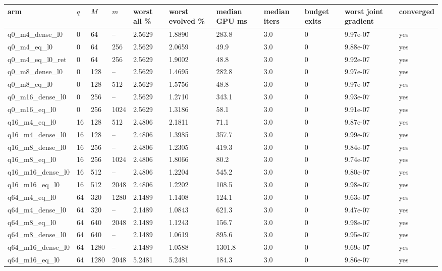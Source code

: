 \documentclass[11pt]{article}
\begin{document}
\begin{table}[htbp]\centering\small
\begin{tabular}{lllllllllll}\hline
arm & $q$ & $M$ & $m$ & worst all \% & worst evolved \% & median GPU ms & median iters & budget exits & worst joint gradient & converged \\ \hline
q0\_m4\_dense\_l0 & 0 & 64 & -- & 2.5629 & 1.8890 & 283.8 & 3.0 & 0 & 9.97e-07 & yes \\
q0\_m4\_eq\_l0 & 0 & 64 & 256 & 2.5629 & 2.0659 & 49.9 & 3.0 & 0 & 9.88e-07 & yes \\
q0\_m4\_eq\_l0\_ret & 0 & 64 & 256 & 2.5629 & 1.9002 & 48.8 & 3.0 & 0 & 9.92e-07 & yes \\
q0\_m8\_dense\_l0 & 0 & 128 & -- & 2.5629 & 1.4695 & 282.8 & 3.0 & 0 & 9.97e-07 & yes \\
q0\_m8\_eq\_l0 & 0 & 128 & 512 & 2.5629 & 1.5756 & 48.8 & 3.0 & 0 & 9.97e-07 & yes \\
q0\_m16\_dense\_l0 & 0 & 256 & -- & 2.5629 & 1.2710 & 343.1 & 3.0 & 0 & 9.93e-07 & yes \\
q0\_m16\_eq\_l0 & 0 & 256 & 1024 & 2.5629 & 1.3186 & 58.1 & 3.0 & 0 & 9.91e-07 & yes \\
q16\_m4\_eq\_l0 & 16 & 128 & 512 & 2.4806 & 2.1811 & 71.1 & 3.0 & 0 & 9.87e-07 & yes \\
q16\_m4\_dense\_l0 & 16 & 128 & -- & 2.4806 & 1.3985 & 357.7 & 3.0 & 0 & 9.99e-07 & yes \\
q16\_m8\_dense\_l0 & 16 & 256 & -- & 2.4806 & 1.2305 & 419.3 & 3.0 & 0 & 9.84e-07 & yes \\
q16\_m8\_eq\_l0 & 16 & 256 & 1024 & 2.4806 & 1.8066 & 80.2 & 3.0 & 0 & 9.74e-07 & yes \\
q16\_m16\_dense\_l0 & 16 & 512 & -- & 2.4806 & 1.2204 & 545.2 & 3.0 & 0 & 9.80e-07 & yes \\
q16\_m16\_eq\_l0 & 16 & 512 & 2048 & 2.4806 & 1.2202 & 108.5 & 3.0 & 0 & 9.98e-07 & yes \\
q64\_m4\_eq\_l0 & 64 & 320 & 1280 & 2.1489 & 1.1408 & 124.1 & 3.0 & 0 & 9.63e-07 & yes \\
q64\_m4\_dense\_l0 & 64 & 320 & -- & 2.1489 & 1.0843 & 621.3 & 3.0 & 0 & 9.47e-07 & yes \\
q64\_m8\_eq\_l0 & 64 & 640 & 2048 & 2.1489 & 1.1243 & 156.7 & 3.0 & 0 & 9.98e-07 & yes \\
q64\_m8\_dense\_l0 & 64 & 640 & -- & 2.1489 & 1.0619 & 895.6 & 3.0 & 0 & 9.95e-07 & yes \\
q64\_m16\_dense\_l0 & 64 & 1280 & -- & 2.1489 & 1.0588 & 1301.8 & 3.0 & 0 & 9.69e-07 & yes \\
q64\_m16\_eq\_l0 & 64 & 1280 & 2048 & 5.2481 & 5.2481 & 184.3 & 3.0 & 0 & 9.86e-07 & yes \\
\hline\end{tabular}
\end{table}
\end{document}
